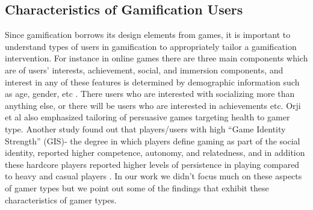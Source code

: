 \documentclass{sig-alternate}
\begin{document}
\subsection{Characteristics of Gamification Users}
Since gamification borrows its design elements from games, it is important to understand types of users in gamification to appropriately tailor a gamification intervention. For instance in online games there are three main components which are of users' interests, achievement, social, and immersion components, and interest in any of these features is determined by demographic information such as age, gender, etc \cite{yee2006:motivations}. There users who are interested with socializing more than anything else, or there will be users who are interested in achievements etc. Orji et al also \cite{orji2013:tailoring} emphasized tailoring of persuasive games targeting health to gamer type. Another study found out that players/users with high ``Game Identity Strength'' (GIS)- the degree in which players define gaming as part of the social identity, reported higher competence, autonomy, and relatedness, and in addition these hardcore players reported higher levels of persistence in playing compared to heavy and casual players \cite{neys2014:exploring}. In our work we didn't focus much on these aspects of gamer types but we point out some of the findings that exhibit these characteristics of gamer types. 
\end{document}
